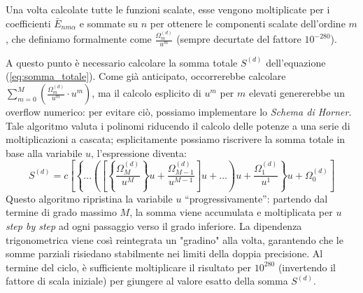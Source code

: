 Una volta calcolate tutte le funzioni scalate, esse vengono moltiplicate per i coefficienti $\bar{E}_{nm\alpha}$ e sommate su $n$ per ottenere le componenti scalate dell'ordine $m$, che definiamo formalmente come $\frac{\Omega_m^{(d)}}{u^m}$ (sempre decurtate del fattore $10^{-280}$).

A questo punto è necessario calcolare la somma totale $S^{(d)}$ dell'equazione (\ref{eq:somma_totale}). Come già anticipato, occorrerebbe calcolare $\sum_{m=0}^{M} \left( \frac{\Omega_m^{(d)}}{u^m} \cdot u^m \right)$, ma il calcolo esplicito di $u^m$ per $m$ elevati genererebbe un overflow numerico: per evitare ciò, possiamo implementare lo \emph{Schema di Horner}. Tale algoritmo valuta i polinomi riducendo il calcolo delle potenze a una serie di moltiplicazioni a cascata; esplicitamente possiamo riscrivere la somma totale in base alla variabile $u$, l'espressione diventa:
\begin{equation}
S^{(d)} = c \left[ \left\{ \dots \left( \left[ \left\{ \frac{\Omega_M^{(d)}}{u^M} \right\} u + \frac{\Omega_{M-1}^{(d)}}{u^{M-1}} \right] u + \dots \right) u + \frac{\Omega_1^{(d)}}{u^1} \right\} u + \Omega_0^{(d)} \right] \label{eq:horner}
\end{equation}
Questo algoritmo ripristina la variabile $u$ ``progressivamente'': partendo dal termine di grado massimo $M$, la somma viene accumulata e moltiplicata per $u$ \textit{step by step} ad ogni passaggio verso il grado inferiore. La dipendenza trigonometrica viene così reintegrata un "gradino" alla volta, garantendo che le somme parziali risiedano stabilmente nei limiti della doppia precisione. Al termine del ciclo, è sufficiente moltiplicare il risultato per $10^{280}$ (invertendo il fattore di scala iniziale) per giungere al valore esatto della somma $S^{(d)}$.

